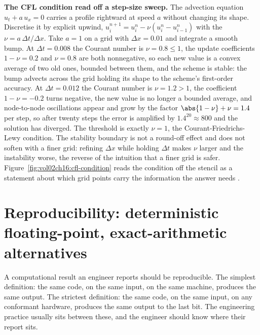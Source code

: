 \begin{example}
\textbf{The CFL condition read off a step-size sweep.} The advection equation
$u_{t} + a\,u_{x} = 0$ carries a profile rightward at speed $a$ without
changing its shape. Discretise it by explicit upwind, $u_{i}^{n+1} = u_{i}^{n}
- \nu(u_{i}^{n} - u_{i-1}^{n})$ with the  $\nu = a\,
\Delta t/\Delta x$. Take $a = 1$ on a grid with $\Delta x = 0.01$ and integrate
a smooth bump. At $\Delta t = 0.008$ the Courant number is $\nu = 0.8 \leq 1$,
the update coefficients $1 - \nu = 0.2$ and $\nu = 0.8$ are both nonnegative, so
each new value is a convex average of two old ones, bounded between them, and
the scheme is stable: the bump advects across the grid holding its shape to the
scheme's first-order accuracy. At $\Delta t = 0.012$ the Courant number is
$\nu = 1.2 > 1$, the coefficient $1 - \nu = -0.2$ turns negative, the new value
is no longer a bounded average, and node-to-node oscillations appear and grow
by the factor $\abs{1 - \nu} + \nu = 1.4$ per step, so after twenty steps the
error is amplified by $1.4^{20} \approx 800$ and the solution has diverged. The
threshold is exactly $\nu = 1$, the Courant-Friedrichs-Lewy condition. The
stability boundary is not a round-off effect and does not soften with a finer
grid: refining $\Delta x$ while holding $\Delta t$ makes $\nu$ larger and the
instability worse, the reverse of the intuition that a finer grid is safer.
Figure~\ref{fig:vol02ch16:cfl-condition} reads the condition off the stencil as
a statement about which grid points carry the information the answer needs
\cite{text:v2ch16-courant-friedrichs-lewy-1928}.
\end{example}



\section{Reproducibility: deterministic floating-point, exact-arithmetic alternatives}

A computational result an engineer reports should be reproducible.
The simplest definition: the same code, on the same input, on the
same machine, produces the same output. The strictest definition:
the same code, on the same input, on any conformant hardware,
produces the same output to the last bit. The engineering
practice usually sits between these, and the engineer should know
where their report sits.

